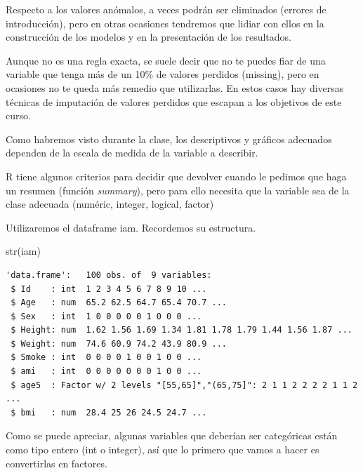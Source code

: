 \documentclass[
  letterpaper,
  DIV=11,
  numbers=noendperiod]{scrreprt}
\newenvironment{Shaded}{\begin{snugshade}}{\end{snugshade}}
\newcommand{\AttributeTok}[1]{\textcolor[rgb]{0.40,0.45,0.13}{#1}}
\newcommand{\FunctionTok}[1]{\textcolor[rgb]{0.28,0.35,0.67}{#1}}
\newcommand{\NormalTok}[1]{\textcolor[rgb]{0.00,0.23,0.31}{#1}}
\newcommand{\OtherTok}[1]{\textcolor[rgb]{0.00,0.23,0.31}{#1}}
\newcommand{\SpecialCharTok}[1]{\textcolor[rgb]{0.37,0.37,0.37}{#1}}
\newcommand{\StringTok}[1]{\textcolor[rgb]{0.13,0.47,0.30}{#1}}
\begin{document}
Respecto a los valores anómalos, a veces podrán ser eliminados (errores
de introducción), pero en otras ocasiones tendremos que lidiar con ellos
en la construcción de los modelos y en la presentación de los
resultados.

Aunque no es una regla exacta, se suele decir que no te puedes fiar de
una variable que tenga más de un 10\% de valores perdidos (missing),
pero en ocasiones no te queda más remedio que utilizarlas. En estos
casos hay diversas técnicas de imputación de valores perdidos que
escapan a los objetivos de este curso.

Como habremos visto durante la clase, los descriptivos y gráficos
adecuados dependen de la escala de medida de la variable a describir.

R tiene algunos criterios para decidir que devolver cuando le pedimos
que haga un resumen (función \emph{summary}), pero para ello necesita
que la variable sea de la clase adecuada (numéric, integer, logical,
factor)

Utilizaremos el dataframe iam. Recordemos su estructura.

\begin{Shaded}
\begin{Highlighting}[]
\FunctionTok{str}\NormalTok{(iam)}
\end{Highlighting}
\end{Shaded}

\begin{verbatim}
'data.frame':   100 obs. of  9 variables:
 $ Id    : int  1 2 3 4 5 6 7 8 9 10 ...
 $ Age   : num  65.2 62.5 64.7 65.4 70.7 ...
 $ Sex   : int  1 0 0 0 0 0 1 0 0 0 ...
 $ Height: num  1.62 1.56 1.69 1.34 1.81 1.78 1.79 1.44 1.56 1.87 ...
 $ Weight: num  74.6 60.9 74.2 43.9 80.9 ...
 $ Smoke : int  0 0 0 0 1 0 0 1 0 0 ...
 $ ami   : int  0 0 0 0 0 0 0 1 0 0 ...
 $ age5  : Factor w/ 2 levels "[55,65]","(65,75]": 2 1 1 2 2 2 2 1 1 2 ...
 $ bmi   : num  28.4 25 26 24.5 24.7 ...
\end{verbatim}

Como se puede apreciar, algunas variables que deberían ser categóricas
están como tipo entero (int o integer), así que lo primero que vamos a
hacer es convertirlas en factores.

\begin{Shaded}
\end{Shaded}
\end{document}
